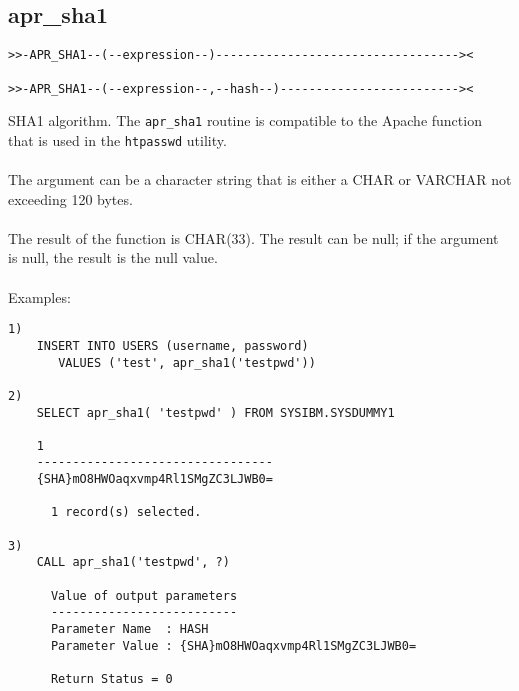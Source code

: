 \subsection{apr\_sha1} \label{aprsha1}
\begin{verbatim}
>>-APR_SHA1--(--expression--)----------------------------------><

>>-APR_SHA1--(--expression--,--hash--)-------------------------><
\end{verbatim}
SHA1 algorithm. The {\tt apr\_sha1} routine is compatible to the Apache function that is used in the {\tt htpasswd} utility.\\
\\
The argument can be a character string that is either a \mbox{CHAR} or \mbox{VARCHAR} not exceeding 120 bytes.\\
\\
The result of the function is CHAR(33). The result can be null; if the argument is null, the result is the null value.\\
\\
Examples:
\begin{verbatim}
1)
    INSERT INTO USERS (username, password)
       VALUES ('test', apr_sha1('testpwd'))

2)
    SELECT apr_sha1( 'testpwd' ) FROM SYSIBM.SYSDUMMY1

    1
    ---------------------------------
    {SHA}mO8HWOaqxvmp4Rl1SMgZC3LJWB0=

      1 record(s) selected.

3)
    CALL apr_sha1('testpwd', ?)

      Value of output parameters
      --------------------------
      Parameter Name  : HASH
      Parameter Value : {SHA}mO8HWOaqxvmp4Rl1SMgZC3LJWB0=

      Return Status = 0
\end{verbatim}
\hypertarget{hvalidatepw}{}
